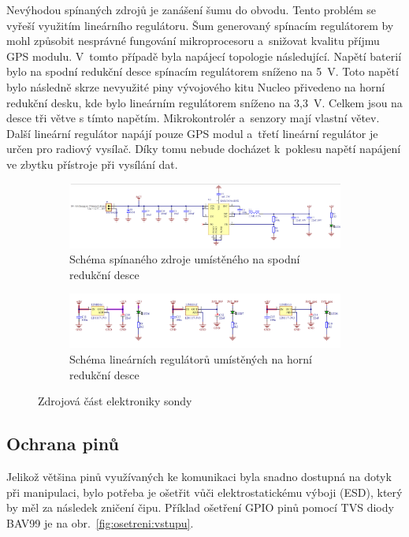 \documentclass[twoside]{ctuthesis}
\theoremstyle{plain}
\theoremstyle{definition}
\theoremstyle{note}
\begin{document}
			Nevýhodou spínaných zdrojů je zanášení šumu do obvodu. Tento problém se vyřeší využitím lineárního regulátoru. Šum generovaný spínacím regulátorem by mohl způsobit nesprávné fungování mikroprocesoru a~snižovat kvalitu příjmu GPS modulu. V~tomto případě byla napájecí topologie následující. Napětí baterií bylo na spodní redukční desce spínacím regulátorem sníženo na 5~V. Toto napětí bylo následně skrze nevyužité piny vývojového kitu Nucleo přivedeno na horní redukční desku, kde bylo lineárním regulátorem sníženo na 3{,}3~V. Celkem jsou na desce tři větve s tímto napětím. Mikrokontrolér a~senzory mají vlastní větev. Další lineární regulátor napájí pouze GPS modul a~třetí lineární regulátor je určen pro radiový vysílač. Díky tomu nebude docházet k~poklesu napětí napájení ve zbytku přístroje při vysílání dat. 
			\begin{figure}
				\begin{subfigure}{\textwidth}
					\centering
					\includegraphics[width = \textwidth]{Figures/psu_bot.png}
					\caption{Schéma spínaného zdroje umístěného na spodní redukční desce}
					\label{fig:psu:bot}
				\end{subfigure}
				\begin{subfigure}{\textwidth}
					\centering
					\includegraphics[width = \textwidth]{Figures/psu_top.png}
					\caption{Schéma lineárních regulátorů umístěných na horní redukční desce}
					\label{fig:psu:top}
				\end{subfigure}
				\caption{Zdrojová část elektroniky sondy}
			\end{figure}
			


		\subsection{Ochrana pinů}
		Jelikož většina pinů využívaných ke komunikaci byla snadno dostupná na dotyk při manipulaci, bylo potřeba je ošetřit vůči elektrostatickému výboji (ESD), který by měl za následek zničení čipu. Příklad ošetření GPIO pinů pomocí TVS diody BAV99 je na obr.~\ref{fig:osetreni:vstupu}.
		
\end{document}
